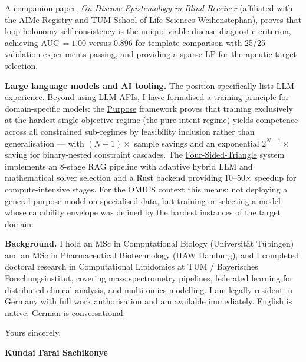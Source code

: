 \documentclass[12pt,a4paper]{article}
\begin{document}
A companion paper, \textit{On Disease Epistemology in Blind Receiver} (affiliated
with the AIMe Registry and TUM School of Life Sciences Weihenstephan), proves that
loop-holonomy self-consistency is the unique viable disease diagnostic criterion,
achieving AUC$\,=1.00$ versus 0.896 for template comparison with 25/25 validation
experiments passing, and providing a sparse LP for therapeutic target selection.

\textbf{Large language models and AI tooling.}
The position specifically lists LLM experience. Beyond using LLM APIs, I have
formalised a training principle for domain-specific models:
the \href{https://github.com/fullscreen-triangle/purpose}{Purpose} framework proves
that training exclusively at the hardest single-objective regime (the pure-intent
regime) yields competence across all constrained sub-regimes by feasibility inclusion
rather than generalisation --- with $(N{+}1)\times$ sample savings and an exponential
$2^{N-1}\times$ saving for binary-nested constraint cascades.
The \href{https://github.com/fullscreen-triangle/four-sided-triangle}{Four-Sided-Triangle}
system implements an 8-stage RAG pipeline with adaptive hybrid LLM and mathematical
solver selection and a Rust backend providing 10--50$\times$ speedup for
compute-intensive stages. For the OMICS context this means: not deploying a
general-purpose model on specialised data, but training or selecting a model whose
capability envelope was defined by the hardest instances of the target domain.

\textbf{Background.}
I hold an MSc in Computational Biology (Universität Tübingen) and an MSc in
Pharmaceutical Biotechnology (HAW Hamburg), and I completed doctoral research in
Computational Lipidomics at TUM / Bayerisches Forschungsinstitut, covering mass
spectrometry pipelines, federated learning for distributed clinical analysis, and
multi-omics modelling. I am legally resident in Germany with full work authorisation
and am available immediately. English is native; German is conversational.

\vspace{1.5em}
Yours sincerely,

\vspace{2.5em}
\textbf{Kundai Farai Sachikonye}
\end{document}

